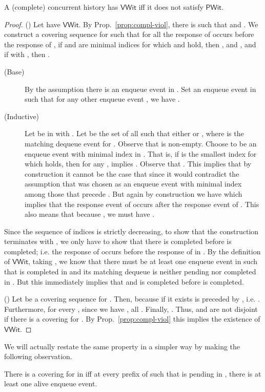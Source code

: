 \documentclass{LMCS}
\newcommand\mylabel[1]{\label{#1}}
\newcommand{\VWit}{\ensuremath{\mathsf{VWit}}}
\newcommand{\PWit}{\ensuremath{\mathsf{PWit}}}
\begin{document}
\begin{lem}\mylabel{lem:vwit-pwit}
A (complete) concurrent history  has {\VWit} iff it does not satisfy {\PWit}.
\end{lem}
\begin{proof}
()
Let  have {\VWit}.
By Prop.~\ref{prop:compl-viol}, there is  such that  and .
We construct a covering sequence  for  such that for all  the response of  occurs before the response of , if  and  are minimal indices for which  and  hold, then , and , and if  with , then .

\begin{description}
\item[(Base)] By the assumption there is an enqueue event in .
Set  an enqueue event in  such that for any other enqueue event , we have .

\item[(Inductive)] Let  be in  with .
Let  be the set of all  such that either  or , where  is the matching dequeue event for .
Observe that  is non-empty.
Choose  to be an enqueue event with minimal index in .
That is, if  is the smallest index for which  holds, then for any ,  implies .
Observe that .
This implies that by construction it cannot be the case that  since it would contradict the assumption that  was chosen as an enqueue event with minimal index among those that precede .
But again by construction we have  which implies that the response event of  occurs after the response event of .
This also means that because , we must have . 

\end{description}
Since the sequence of indices  is strictly decreasing, to show that the construction terminates with , we only have to show that there is  completed before  is completed; i.e. the response of  occurs before the response of  in .
By the definition of {\VWit}, taking , we know that there must be at least one enqueue event  in  such that  is completed in  and its matching dequeue is neither pending nor completed in . 
But this immediately implies that  and  is completed before  is completed.


()
Let  be a covering sequence for .
Then,  because  if it exists is preceded by , i.e. .
Furthermore, for every , since we have , all .
Finally, . 
Thus,  and  are not disjoint if there is a covering for .
By Prop.~\ref{prop:compl-viol} this implies the existence of {\VWit}.
\end{proof}

\noindent
We will actually restate the same property in a simpler way by making the
following observation.
\begin{prop}
There is a covering for  in  iff at every prefix  of  such that
 is pending in , there is at least one alive enqueue event.
\end{prop}
\end{document}
